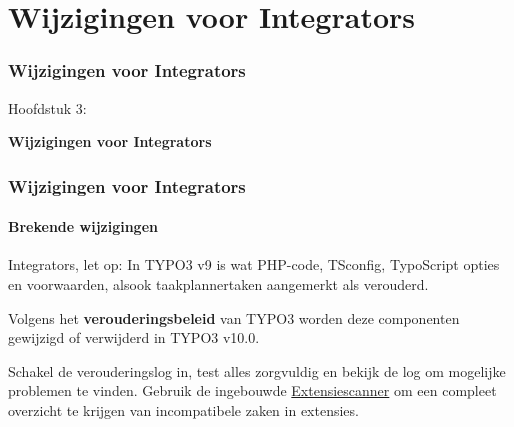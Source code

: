 %

\section{Wijzigingen voor Integrators}
\begin{frame}[fragile]
	\frametitle{Wijzigingen voor Integrators}

	\begin{center}\huge{Hoofdstuk 3:}\end{center}
	\begin{center}\huge{\color{typo3darkgrey}\textbf{Wijzigingen voor Integrators}}\end{center}

\end{frame}


\begin{frame}[fragile]
	\frametitle{Wijzigingen voor Integrators}
	\framesubtitle{Brekende wijzigingen}

	\small
		Integrators, let op: In TYPO3 v9 is wat PHP-code, TSconfig, TypoScript
		opties en voorwaarden, alsook taakplannertaken aangemerkt als verouderd.

		\vspace{0.2cm}

		Volgens het \textbf{verouderingsbeleid} van TYPO3 worden deze componenten
		gewijzigd of verwijderd in TYPO3 v10.0.

		\vspace{0.2cm}

		Schakel de verouderingslog in, test alles zorgvuldig en bekijk de log om
		mogelijke problemen te vinden. Gebruik de ingebouwde
		\href{https://docs.typo3.org/m/typo3/reference-coreapi/master/en-us/ApiOverview/ExtensionScanner/Index.html}{Extensiescanner}
		om een compleet overzicht te krijgen van incompatibele zaken in extensies.

	\normalsize

\end{frame}

